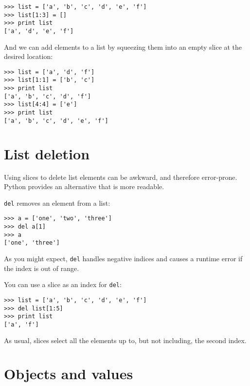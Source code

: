 \beforeverb
\begin{verbatim}
>>> list = ['a', 'b', 'c', 'd', 'e', 'f']
>>> list[1:3] = []
>>> print list
['a', 'd', 'e', 'f']
\end{verbatim}
\afterverb
%
And we can add elements to a list by squeezing them into an empty
slice at the desired location:

\beforeverb
\begin{verbatim}
>>> list = ['a', 'd', 'f']
>>> list[1:1] = ['b', 'c']
>>> print list
['a', 'b', 'c', 'd', 'f']
>>> list[4:4] = ['e']
>>> print list
['a', 'b', 'c', 'd', 'e', 'f']
\end{verbatim}
\afterverb
%

\section{List deletion}

Using slices to delete list elements can be
awkward, and therefore error-prone.  Python provides an alternative
that is more readable.

{\tt del} removes an element from a list:

\beforeverb
\begin{verbatim}
>>> a = ['one', 'two', 'three']
>>> del a[1]
>>> a
['one', 'three']
\end{verbatim}
\afterverb
%
As you might expect, {\tt del} handles negative indices
and causes a runtime error if the index is
out of range.

You can use a slice as an index for {\tt del}:

\beforeverb
\begin{verbatim}
>>> list = ['a', 'b', 'c', 'd', 'e', 'f']
>>> del list[1:5]
>>> print list
['a', 'f']
\end{verbatim}
\afterverb
%
As usual, slices select all the elements up to, but not
including, the second index.




\pagebreak

\section{Objects and values}

